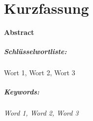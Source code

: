 \chapter*{Kurzfassung}
\thispagestyle{empty}
\blindtext
\vspace{2\baselineskip}

\subsubsection*{Abstract}
\textit{\blindtext@english}
\vspace{10\baselineskip}


\paragraph*{Schlüsselwortliste:}
Wort 1, Wort 2, Wort 3

\vspace{-1\baselineskip}

\paragraph*{Keywords:}
\textit{Word 1, Word 2, Word 3}
\clearpage
